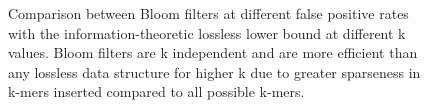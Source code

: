 \documentclass{pnastwo}
\begin{document}
\begin{figure}

\caption{Comparison between Bloom filters at different false positive 
rates with the information-theoretic lossless lower bound at different 
k values. Bloom filters are k independent and are more efficient than 
any lossless data structure for higher k due to greater sparseness in 
k-mers inserted compared to all possible k-mers.}

\label{fig:membound}
\end{figure}

\makeatother

\end{document}
